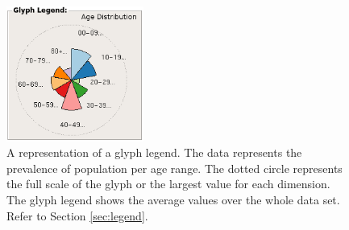 \begin{figure}[ht!]
\centering
\includegraphics[width=0.4\textwidth]{images/GlyphLegend2} 
\caption{A representation of a glyph legend. The data represents the prevalence of population per age range. The dotted circle represents the full scale of the glyph or the largest value for each dimension. The glyph legend shows the average values over the whole data set. Refer to Section \ref{sec:legend}.} \label{fig:legend}
\vspace{-0.2cm}
\end{figure}


